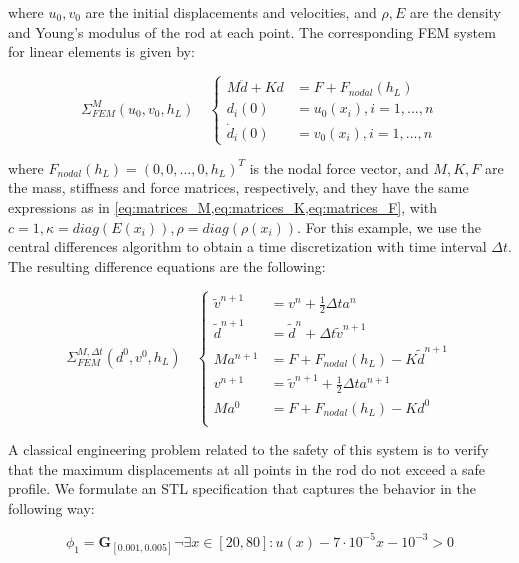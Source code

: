 \documentclass[letterpaper, 10 pt, conference]{ieeeconf/ieeeconf}
\newcommand{\Always}{\mathbf{G}}
\begin{document}
where $u_0, v_0$ are the initial displacements and velocities, and $\rho, E$ are
the density and Young's modulus of the rod at each point.
The corresponding FEM system for linear elements is given by:

\begin{equation}\label{eq:fem_mech}
    \Sigma^M_{FEM}(u_0, v_0, h_L) \quad \left \{
    \begin{aligned}
        M\ddot{d} + K d &= F + F_{nodal}(h_L) \\
        d_i(0) &= u_0(x_i), i = 1,...,n \\
        \dot{d}_i(0) &= v_0(x_i), i = 1,...,n
    \end{aligned}
    \right.
\end{equation}

where $F_{nodal}(h_L) = (0, 0, ..., 0, h_L)^T$ is the nodal force vector, and $M, K, F$ 
are the mass, stiffness and force matrices, respectively, and
they have the same expressions as in
\cref{eq:matrices_M,eq:matrices_K,eq:matrices_F}, with $c = 1, \kappa =
diag(E(x_i)), \rho = diag(\rho(x_i))$.
For this example, we use the central differences algorithm to obtain a time
discretization with time interval $\Delta t$. The resulting difference equations
are the following:

\begin{equation}
    \Sigma^{M, \Delta t}_{FEM}(d^0, v^0, h_L) \quad \left \{
    \begin{aligned}
        \tilde v^{n+1} &= v^n + \frac{1}{2} \Delta t a^n \\
        \tilde d^{n+1} &= \tilde d^{n} + \Delta t \tilde v^{n+1} \\
        M a^{n+1} &= F + F_{nodal}(h_L) - K \tilde d^{n+1} \\
        v^{n+1} &= \tilde v^{n+1} + \frac{1}{2} \Delta t a^{n+1} \\
        M a^0 &= F + F_{nodal}(h_L) - K d^0 \\
    \end{aligned}
    \right.
\end{equation}

A classical engineering problem related to the safety of this system is to
verify that the maximum displacements at all points in the rod do not exceed a
safe profile. We formulate an STL specification that captures the behavior in
the following way:

\begin{equation}
    \phi_1 = \Always_{[0.001, 0.005]} \lnot \exists x \in [20, 80]: u(x) - 7 \cdot
    10^{-5} x - 10^{-3} > 0
\end{equation}
\end{document}
